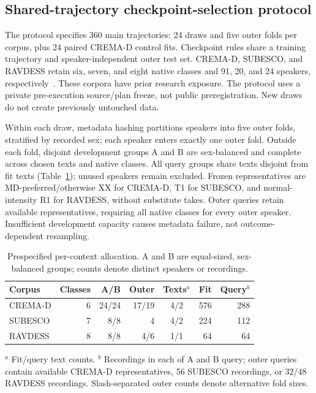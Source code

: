 \subsection{Shared-trajectory checkpoint-selection protocol}
\label{sec:final-program-methods}

The protocol specifies 360 main trajectories: 24 draws and five outer folds
per corpus, plus 24 paired CREMA-D control fits. Checkpoint rules share a
training trajectory and speaker-independent outer test set. CREMA-D,
SUBESCO, and RAVDESS retain six, seven, and eight native classes and
91, 20, and 24 speakers, respectively~\cite{cremad,subesco,ravdess}.
These corpora have prior research exposure. The protocol uses a private
pre-execution source/plan freeze, not public preregistration. New draws do
not create previously untouched data.

Within each draw, metadata hashing partitions speakers into five outer
folds, stratified by recorded sex; each speaker enters exactly one outer
fold. Outside each fold, disjoint development
groups A and B are sex-balanced and complete across chosen texts and
native classes. All query groups share texts disjoint from fit texts
(Table~\ref{tab:final-program-panels}); unused speakers remain excluded.
Frozen representatives are MD-preferred/otherwise XX for CREMA-D, T1 for
SUBESCO, and normal-intensity R1 for RAVDESS, without substitute takes.
Outer queries retain available representatives, requiring all native
classes for every outer speaker. Insufficient development capacity causes
metadata failure, not outcome-dependent resampling.

\begin{table}[t]
\centering
\caption{Prespecified per-context allocation. A and B are equal-sized,
sex-balanced groups; counts denote distinct speakers or recordings.}
\label{tab:final-program-panels}
\small
\setlength{\tabcolsep}{3pt}
\begin{tabular}{lrrrcrr}
\hline
Corpus & Classes & A/B & Outer & Texts$^a$ & Fit & Query$^b$\\
\hline
CREMA-D & 6 & 24/24 & 17/19 & 4/2 & 576 & 288\\
SUBESCO & 7 & 8/8 & 4 & 4/2 & 224 & 112\\
RAVDESS & 8 & 8/8 & 4/6 & 1/1 & 64 & 64\\
\hline
\end{tabular}
\par\raggedright\small
$^a$ Fit/query text counts. $^b$ Recordings in each of A and B query;
outer queries contain available CREMA-D representatives, 56 SUBESCO
recordings, or 32/48 RAVDESS recordings. Slash-separated outer counts
denote alternative fold sizes.
\end{table}

